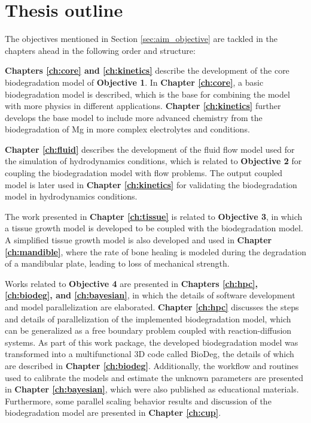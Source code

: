 \section{Thesis outline}

The objectives mentioned in Section \ref{sec:aim_objective} are tackled in the chapters ahead in the following order and structure:

\textbf{Chapters \ref{ch:core} and \ref{ch:kinetics}} describe the development of the core biodegradation model of \textbf{Objective 1}. In \textbf{Chapter \ref{ch:core}}, a basic biodegradation model is described, which is the base for combining the model with more physics in different applications. \textbf{Chapter \ref{ch:kinetics}} further develops the base model to include more advanced chemistry from the biodegradation of Mg in more complex electrolytes and conditions.

\textbf{Chapter \ref{ch:fluid}} describes the development of the fluid flow model used for the simulation of hydrodynamics conditions, which is related to \textbf{Objective 2} for coupling the biodegradation model with flow problems. The output coupled model is later used in \textbf{Chapter \ref{ch:kinetics}} for validating the biodegradation model in hydrodynamics conditions.

The work presented in \textbf{Chapter \ref{ch:tissue}} is related to \textbf{Objective 3}, in which a tissue growth model is developed to be coupled with the biodegradation model. A simplified tissue growth model is also developed and used in \textbf{Chapter \ref{ch:mandible}}, where the rate of bone healing is modeled during the degradation of a mandibular plate, leading to loss of mechanical strength.

Works related to \textbf{Objective 4} are presented in \textbf{Chapters \ref{ch:hpc}, \ref{ch:biodeg}, and \ref{ch:bayesian}}, in which the details of software development and model parallelization are elaborated. \textbf{Chapter \ref{ch:hpc}} discusses the steps and details of parallelization of the implemented biodegradation model, which can be generalized as a free boundary problem coupled with reaction-diffusion systems. As part of this work package, the developed biodegradation model was transformed into a multifunctional 3D code called BioDeg, the details of which are described in \textbf{Chapter \ref{ch:biodeg}}. Additionally, the workflow and routines used to calibrate the models and estimate the unknown parameters are presented in \textbf{Chapter \ref{ch:bayesian}}, which were also published as educational materials. Furthermore, some parallel scaling behavior results and discussion of the biodegradation model are presented in \textbf{Chapter \ref{ch:cup}}.

